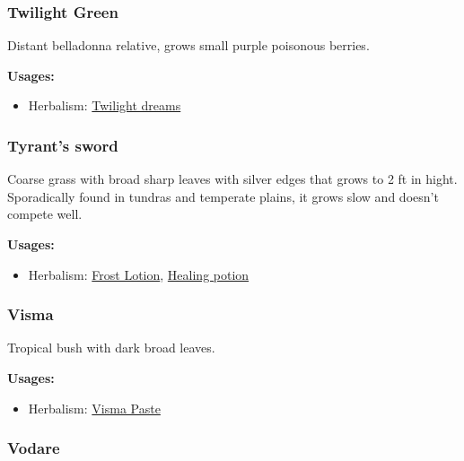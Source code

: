 \subsubsection{Twilight Green}
\label{Twilight Green}

Distant belladonna relative, grows small purple poisonous berries.

\vspace{5mm}

\textbf{Usages:}

\begin{itemize}[noitemsep]
\item[] Herbalism: \hyperref[Twilight dreams]{Twilight dreams}
\end{itemize}

\subsubsection{Tyrant's sword}
\label{Tyrant's Sword}

Coarse grass with broad sharp leaves with silver edges that grows to 2 ft in hight. Sporadically found in tundras and temperate plains, it grows slow and doesn't compete well.

\vspace{5mm}

\textbf{Usages:}

\begin{itemize}[noitemsep]
\item[] Herbalism: \hyperref[Frost Lotion]{Frost Lotion}, \hyperref[healing_potion]{Healing potion}
\end{itemize}

\subsubsection{Visma}
\label{Visma}

Tropical bush with dark broad leaves.

\vspace{5mm}

\textbf{Usages:}

\begin{itemize}[noitemsep]
\item[] Herbalism: \hyperref[Visma Paste]{Visma Paste}
\end{itemize}

\subsubsection{Vodare}
\label{Vodare}

